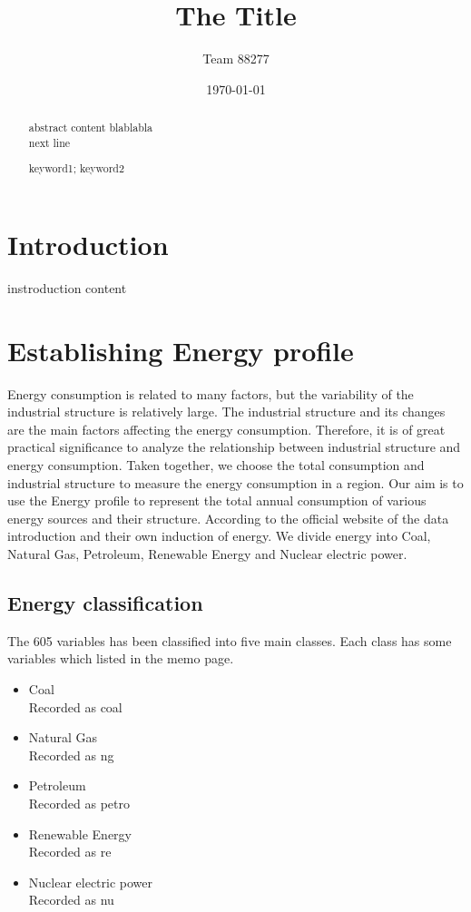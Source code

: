 \documentclass{mcmthesis}
\title{The Title}
\author{Team 88277}
\date{\today}
\begin{document}
\begin{abstract}
abstract content blablabla \\
next line
\begin{keywords}
keyword1; keyword2
\end{keywords}

\end{abstract}

\maketitle                  %
\tableofcontents
\section{Introduction}
instroduction content
\section{Establishing Energy profile}
Energy consumption is related to many factors, but the variability of the industrial structure is relatively large. The industrial structure and its changes are the main factors affecting the energy consumption. Therefore, it is of great practical significance to analyze the relationship between industrial structure and energy consumption. Taken together, we choose the total consumption and industrial structure to measure the energy consumption in a region.
Our aim is to use the Energy profile to represent the total annual consumption of various energy sources and their structure. According to the official website of the data introduction and their own induction of energy. We divide energy into Coal, Natural Gas, Petroleum, Renewable Energy and Nuclear electric power.
\subsection{Energy classification}
The 605 variables has been classified into five main classes. Each class has some variables which listed in the memo page.
\begin{itemize}
    \item Coal\\
    Recorded as coal
    \item Natural Gas\\
    Recorded as ng
    \item Petroleum\\
    Recorded as petro
    \item Renewable Energy\\
    Recorded as re
    \item Nuclear electric power\\
    Recorded as nu
\end{itemize}
\end{document}

